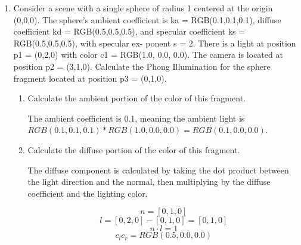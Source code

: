 \documentclass{article}
\begin{document}
\begin{enumerate}
            \begin{mdframed}
                I am assuming that by big the table means that
                the p value is small, since the specular
                value is between 0 and 1, (clamped) raising it
                to a power will actually lower the value.
            \end{mdframed}

        \item Consider a scene with a single sphere of radius 1 centered at the origin (0,0,0).
            The sphere’s ambient coefficient is ka = RGB(0.1,0.1,0.1), diffuse coefficient kd =
            RGB(0.5,0.5,0.5), and specular coefficient ks = RGB(0.5,0.5,0.5), with specular ex-
            ponent s = 2. There is a light at position p1 = (0,2,0) with color c1 = RGB(1.0,
            0.0, 0.0). The camera is located at position p2 = (3,1,0). Calculate the Phong
            Illumination for the sphere fragment located at position p3 = (0,1,0).

            \begin{enumerate}
                \item Calculate the ambient portion of the color of this fragment.
                    \begin{mdframed}
                       The ambient coefficient is 0.1, meaning
                       the ambient light is $RGB(0.1, 0.1, 0.1) * RGB(1.0, 0.0, 0.0) = RGB(0.1, 0.0, 0.0)$.
                    \end{mdframed}

                \item Calculate the diffuse portion of the color of this fragment.
                    \begin{mdframed}
                        The diffuse component is calculated by taking
                        the dot product between the light direction and the normal,
                        then multiplying by the diffuse coefficient and the lighting
                        color.

                        \begin{displaymath}
                            n = [0, 1, 0]
                        \end{displaymath}
                        \begin{displaymath}
                            l = [0, 2, 0] - [0, 1, 0]
                            = [0, 1, 0]
                        \end{displaymath}
                        \begin{displaymath}
                            n \cdot l = 1
                        \end{displaymath}
                        \begin{displaymath}
                            c_l c_r = RGB(0.5, 0.0, 0.0)
                        \end{displaymath}
                    \end{mdframed}


\end{enumerate}
\end{enumerate}
\end{document}

